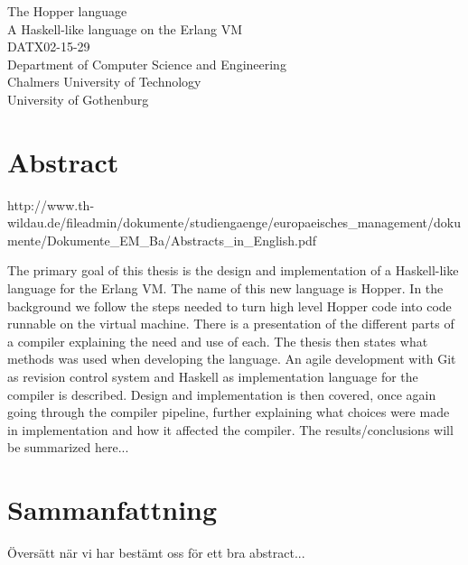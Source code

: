 The Hopper language\\
A Haskell-like language on the Erlang VM\\
DATX02-15-29\\
Department of Computer Science and Engineering\\
Chalmers University of Technology\\
University of Gothenburg\\

\thispagestyle{plain}			%
\section*{Abstract}



http://www.th-wildau.de/fileadmin/dokumente/studiengaenge/europaeisches_management/dokumente/Dokumente_EM_Ba/Abstracts_in_English.pdf



The primary goal of this thesis is the design and implementation of a Haskell-like language for the Erlang VM. The name of this new language is Hopper.
In the background we follow the steps needed to turn high level Hopper code into code runnable on the virtual machine. There is a presentation of the different parts of a compiler explaining the need and use of each. The thesis then states what methods was used when developing the language. An agile development with Git as revision control system and Haskell as implementation language for the compiler is described. Design and implementation is then covered, once again going through the compiler pipeline, further explaining what choices were made in implementation and how it affected the compiler.
The results/conclusions will be summarized here...









\section*{Sammanfattning}
Översätt när vi har bestämt oss för ett bra abstract...



\newpage				%
\thispagestyle{empty}
\mbox{}